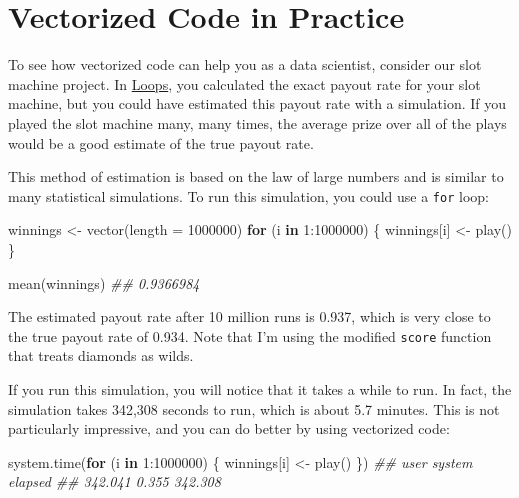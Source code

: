 \documentclass[
  letterpaper,
  DIV=11,
  numbers=noendperiod]{scrbook}
\newenvironment{Shaded}{\begin{snugshade}}{\end{snugshade}}
\newcommand{\AttributeTok}[1]{\textcolor[rgb]{0.40,0.45,0.13}{#1}}
\newcommand{\ControlFlowTok}[1]{\textcolor[rgb]{0.00,0.23,0.31}{\textbf{#1}}}
\newcommand{\DecValTok}[1]{\textcolor[rgb]{0.68,0.00,0.00}{#1}}
\newcommand{\DocumentationTok}[1]{\textcolor[rgb]{0.37,0.37,0.37}{\textit{#1}}}
\newcommand{\FunctionTok}[1]{\textcolor[rgb]{0.28,0.35,0.67}{#1}}
\newcommand{\NormalTok}[1]{\textcolor[rgb]{0.00,0.23,0.31}{#1}}
\newcommand{\OtherTok}[1]{\textcolor[rgb]{0.00,0.23,0.31}{#1}}
\newcommand{\SpecialCharTok}[1]{\textcolor[rgb]{0.37,0.37,0.37}{#1}}
\begin{document}
\section{Vectorized Code in Practice}\label{vectorized-code-in-practice}

To see how vectorized code can help you as a data scientist, consider
our slot machine project. In \hyperref[sec-loops]{Loops}, you calculated
the exact payout rate for your slot machine, but you could have
estimated this payout rate with a simulation. If you played the slot
machine many, many times, the average prize over all of the plays would
be a good estimate of the true payout rate.

This method of estimation is based on the law of large numbers and is
similar to many statistical simulations. To run this simulation, you
could use a \texttt{for} loop:

\begin{Shaded}
\begin{Highlighting}[]
\NormalTok{winnings }\OtherTok{\textless{}{-}} \FunctionTok{vector}\NormalTok{(}\AttributeTok{length =} \DecValTok{1000000}\NormalTok{)}
\ControlFlowTok{for}\NormalTok{ (i }\ControlFlowTok{in} \DecValTok{1}\SpecialCharTok{:}\DecValTok{1000000}\NormalTok{) \{}
\NormalTok{  winnings[i] }\OtherTok{\textless{}{-}} \FunctionTok{play}\NormalTok{()}
\NormalTok{\}}

\FunctionTok{mean}\NormalTok{(winnings)}
\DocumentationTok{\#\# 0.9366984}
\end{Highlighting}
\end{Shaded}

The estimated payout rate after 10 million runs is 0.937, which is very
close to the true payout rate of 0.934. Note that I'm using the modified
\texttt{score} function that treats diamonds as wilds.

If you run this simulation, you will notice that it takes a while to
run. In fact, the simulation takes 342,308 seconds to run, which is
about 5.7 minutes. This is not particularly impressive, and you can do
better by using vectorized code:

\begin{Shaded}
\begin{Highlighting}[]
\FunctionTok{system.time}\NormalTok{(}\ControlFlowTok{for}\NormalTok{ (i }\ControlFlowTok{in} \DecValTok{1}\SpecialCharTok{:}\DecValTok{1000000}\NormalTok{) \{}
\NormalTok{  winnings[i] }\OtherTok{\textless{}{-}} \FunctionTok{play}\NormalTok{()}
\NormalTok{\})}
\DocumentationTok{\#\#    user  system elapsed }
\DocumentationTok{\#\# 342.041   0.355 342.308 }
\end{Highlighting}
\end{Shaded}
\end{document}
